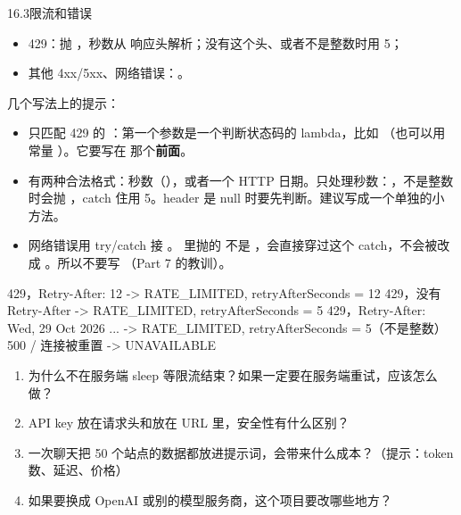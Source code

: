 \begin{task}{16.3\quad 限流和错误}
\begin{itemize}
  \item 429：抛 ，秒数从  响应头解析；没有这个头、或者不是整数时用 5；
  \item 其他 4xx/5xx、网络错误：。
\end{itemize}

几个写法上的提示：
\begin{itemize}
  \item 只匹配 429 的 ：第一个参数是一个判断状态码的 lambda，比如 （也可以用常量 ）。它要写在  那个\textbf{前面}。
  \item {} 有两种合法格式：秒数（），或者一个 HTTP 日期。只处理秒数：，不是整数时会抛 ，catch 住用 5。header 是 null 时要先判断。建议写成一个单独的小方法。
  \item 网络错误用 try/catch 接 。 里抛的  不是 ，会直接穿过这个 catch，不会被改成 。所以不要写 （Part 7 的教训）。
\end{itemize}

\begin{example}
\begin{plaincode}
429，Retry-After: 12                   ->  RATE_LIMITED, retryAfterSeconds = 12
429，没有 Retry-After                   ->  RATE_LIMITED, retryAfterSeconds = 5
429，Retry-After: Wed, 29 Oct 2026 ...  ->  RATE_LIMITED, retryAfterSeconds = 5（不是整数）
500 / 连接被重置                        ->  UNAVAILABLE
\end{plaincode}
\end{example}
\end{task}

\begin{think}
\begin{enumerate}
  \item 为什么不在服务端 sleep 等限流结束？如果一定要在服务端重试，应该怎么做？
  \item API key 放在请求头和放在 URL 里，安全性有什么区别？
  \item 一次聊天把 50 个站点的数据都放进提示词，会带来什么成本？（提示：token 数、延迟、价格）
  \item 如果要换成 OpenAI 或别的模型服务商，这个项目要改哪些地方？
\end{enumerate}
\end{think}
